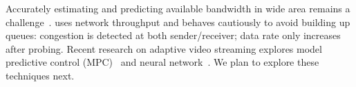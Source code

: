  Accurately estimating and predicting
available bandwidth in wide area remains a challenge~\cite{huang2012confused,
  zou2015can}. \awstream{} uses network throughput and behaves cautiously to
avoid building up queues: congestion is detected at both sender/receiver; data
rate only increases after probing.  Recent research on adaptive video streaming
explores model predictive control (MPC)~\cite{yin2015control, sun2016cs2p} and
neural network~\cite{mao2017neural}. We plan to explore these techniques next.



